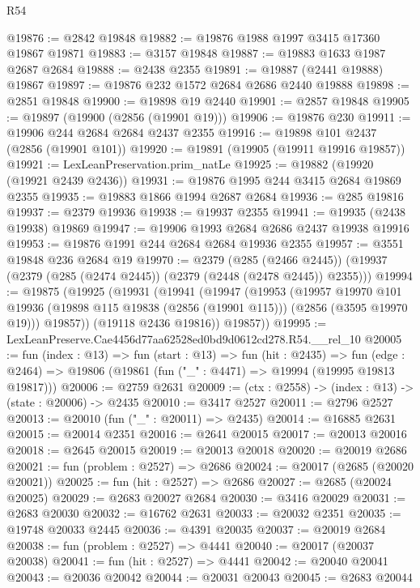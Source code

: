 \begin{lexlean}{R54}
\begin{coremodule}
@19876 := @2842 @19848
@19882 := @19876 @1988 @1997 @3415 @17360 @19867 @19871
@19883 := @3157 @19848
@19887 := @19883 @1633 @1987 @2687 @2684
@19888 := @2438 @2355
@19891 := @19887 (@2441 @19888) @19867
@19897 := @19876 @232 @1572 @2684 @2686 @2440 @19888
@19898 := @2851 @19848
@19900 := @19898 @19 @2440
@19901 := @2857 @19848
@19905 := @19897 (@19900 (@2856 (@19901 @19)))
@19906 := @19876 @230
@19911 := @19906 @244 @2684 @2684 @2437 @2355
@19916 := @19898 @101 @2437 (@2856 (@19901 @101))
@19920 := @19891 (@19905 (@19911 @19916 @19857))
@19921 := LexLeanPreservation.prim_natLe
@19925 := @19882 (@19920 (@19921 @2439 @2436))
@19931 := @19876 @1995 @244 @3415 @2684 @19869 @2355
@19935 := @19883 @1866 @1994 @2687 @2684
@19936 := @285 @19816
@19937 := @2379 @19936
@19938 := @19937 @2355
@19941 := @19935 (@2438 @19938) @19869
@19947 := @19906 @1993 @2684 @2686 @2437 @19938 @19916
@19953 := @19876 @1991 @244 @2684 @2684 @19936 @2355
@19957 := @3551 @19848 @236 @2684 @19
@19970 := @2379
    (@285 (@2466 @2445))
    (@19937 (@2379 (@285 (@2474 @2445)) (@2379 (@2448 (@2478 @2445)) @2355)))
@19994 := @19875
    (@19925
      (@19931
        (@19941
          (@19947
            (@19953
              (@19957
                @19970
                @101
                @19936
                (@19898 @115 @19838 (@2856 (@19901 @115)))
                (@2856 (@3595 @19970 @19)))
              @19857))
          (@19118 @2436 @19816))
        @19857))
@19995 := LexLeanPreserve.Cae4456d77aa62528ed0bd9d0612cd278.R54.__rel_10
@20005 := fun (index : @13) =>
  fun (start : @13) =>
  fun (hit : @2435) =>
  fun (edge : @2464) => @19806 (@19861 (fun ("_" : @4471) => @19994 (@19995 @19813 @19817)))
@20006 := @2759 @2631
@20009 := (ctx : @2558) -> (index : @13) -> (state : @20006) -> @2435
@20010 := @3417 @2527
@20011 := @2796 @2527
@20013 := @20010 (fun ("_" : @20011) => @2435)
@20014 := @16885 @2631
@20015 := @20014 @2351
@20016 := @2641 @20015
@20017 := @20013 @20016
@20018 := @2645 @20015
@20019 := @20013 @20018
@20020 := @20019 @2686
@20021 := fun (problem : @2527) => @2686
@20024 := @20017 (@2685 (@20020 @20021))
@20025 := fun (hit : @2527) => @2686
@20027 := @2685 (@20024 @20025)
@20029 := @2683 @20027 @2684
@20030 := @3416 @20029
@20031 := @2683 @20030
@20032 := @16762 @2631
@20033 := @20032 @2351
@20035 := @19748 @20033 @2445
@20036 := @4391 @20035
@20037 := @20019 @2684
@20038 := fun (problem : @2527) => @4441
@20040 := @20017 (@20037 @20038)
@20041 := fun (hit : @2527) => @4441
@20042 := @20040 @20041
@20043 := @20036 @20042
@20044 := @20031 @20043
@20045 := @2683 @20044

\end{coremodule}
\end{lexlean}
